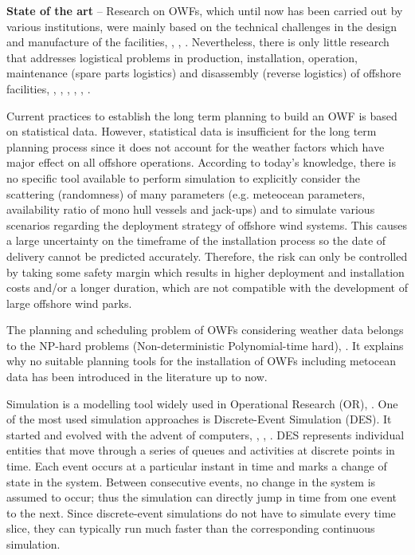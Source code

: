 \textbf{State of the art} --
Research on OWFs, which until now has been carried out by various institutions, were mainly based on the technical challenges in the design and manufacture of the facilities, \cite{Miller2013}, \cite{SerranoGonzalez2014}, \cite{Perveen2014}. Nevertheless, there is only little research that addresses logistical problems in production, installation, operation, maintenance (spare parts logistics) and disassembly (reverse logistics) of offshore facilities, \cite{Scholz2010}, \cite{Lange2012}, \cite{COMPIT11}, \cite{COMPIT12}, \cite{aitsimulation}, \cite{thalji2012}.

Current practices to establish the long term planning to build an OWF is based on statistical data. However, statistical data is insufficient for the long term planning process since it does not account for the weather factors which have major effect on all offshore operations. According to today’s knowledge, there is no specific tool available to perform simulation to explicitly consider the scattering (randomness) of many parameters (e.g. meteocean parameters, availability ratio of mono hull vessels and jack-ups) and to simulate various scenarios regarding the deployment strategy of offshore wind systems. This causes a large uncertainty on the timeframe of the installation process so the date of delivery cannot be predicted accurately. Therefore, the risk can only be controlled by taking some safety margin which results in higher deployment and installation costs and/or a longer duration, which are not compatible with the development of large offshore wind parks.

The planning and scheduling problem of OWFs considering weather data belongs to the NP-hard problems (Non-deterministic Polynomial-time hard), \cite{leeuwen1990}. It explains why no suitable planning tools for the installation of OWFs including metocean data has been introduced in the literature up to now.

Simulation is a modelling tool widely used in Operational Research (OR), \cite{pidd2005computer}. One of the most used simulation approaches is Discrete-Event Simulation (DES). It started and evolved with the advent of computers, \cite{Myron1987}, \cite {William1988}, \cite{robinson2005}. DES represents individual entities that move through a series of queues and activities at discrete points in time. Each event occurs at a particular instant in time and marks a change of state in the system. Between consecutive events, no change in the system is assumed to occur; thus the simulation can directly jump in time from one event to the next. Since discrete-event simulations do not have to simulate every time slice, they can typically run much faster than the corresponding continuous simulation.

